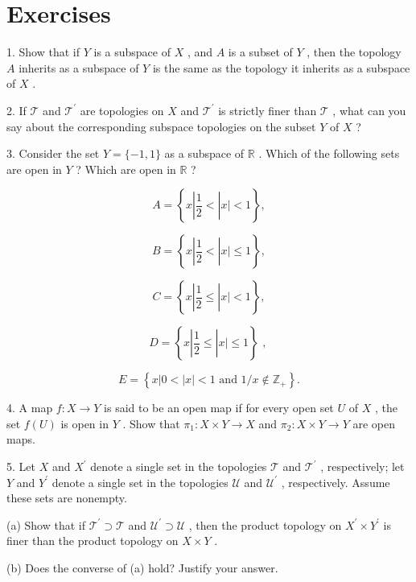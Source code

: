 \section*{Exercises}

1. Show that if \(Y\) is a subspace of \(X\) , and \(A\) is a subset of \(Y\) , then the topology \(A\) inherits as a subspace of \(Y\) is the same as the topology it inherits as a subspace of \(X\) .

2. If \(\mathcal{T}\) and \({\mathcal{T}}^{\prime }\) are topologies on \(X\) and \({\mathcal{T}}^{\prime }\) is strictly finer than \(\mathcal{T}\) , what can you say about the corresponding subspace topologies on the subset \(Y\) of \(X\) ?

3. Consider the set \(Y = \{  - 1,1\}\) as a subspace of \(\mathbb{R}\) . Which of the following sets are open in \(Y\) ? Which are open in \(\mathbb{R}\) ?

\[
A = \left\{  {x\left| {\frac{1}{2} < }\right| x \mid   < 1}\right\}  ,
\]

\[
B = \left\{  {x\left| {\frac{1}{2} < }\right| x \mid   \leq  1}\right\}  ,
\]

\[
C = \left\{  {x\left| {\frac{1}{2} \leq  }\right| x \mid   < 1}\right\}  ,
\]

\[
D = \left\{  {x\left| {\frac{1}{2} \leq  }\right| x \mid   \leq  1}\right\}  \text{ , }
\]

\[
E = \left\{  {x\left| {0 < }\right| x \mid   < 1\text{ and }1/x \notin  {\mathbb{Z}}_{ + }}\right\}  .
\]

4. A map \(f : X \rightarrow  Y\) is said to be an open map if for every open set \(U\) of \(X\) , the set \(f\left( U\right)\) is open in \(Y\) . Show that \({\pi }_{1} : X \times  Y \rightarrow  X\) and \({\pi }_{2} : X \times  Y \rightarrow  Y\) are open maps.

5. Let \(X\) and \({X}^{\prime }\) denote a single set in the topologies \(\mathcal{T}\) and \({\mathcal{T}}^{\prime }\) , respectively; let \(Y\) and \({Y}^{\prime }\) denote a single set in the topologies \(\mathcal{U}\) and \({\mathcal{U}}^{\prime }\) , respectively. Assume these sets are nonempty.

(a) Show that if \({\mathcal{T}}^{\prime } \supset  \mathcal{T}\) and \({\mathcal{U}}^{\prime } \supset  \mathcal{U}\) , then the product topology on \({X}^{\prime } \times  {Y}^{\prime }\) is finer than the product topology on \(X \times  Y\) .

(b) Does the converse of (a) hold? Justify your answer.

